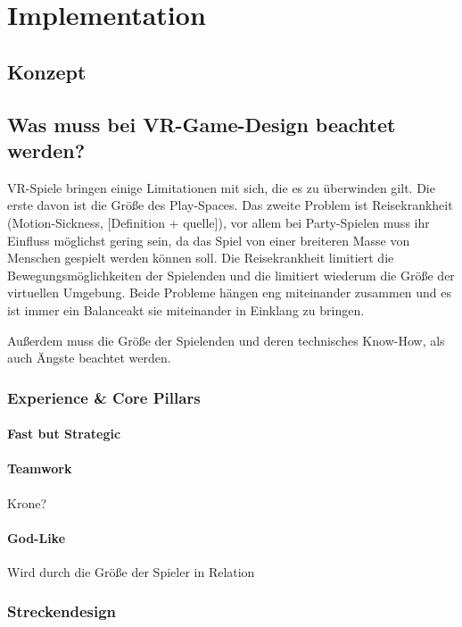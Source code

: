 \chapter{Implementation}

\section{Konzept}

\section{Was muss bei VR-Game-Design beachtet werden?}

VR-Spiele bringen einige Limitationen mit sich, die es zu überwinden gilt. Die erste davon ist die Größe des Play-Spaces. Das zweite Problem ist Reisekrankheit (Motion-Sickness, [Definition + quelle]), vor allem bei Party-Spielen muss ihr Einfluss möglichst gering sein, da das Spiel von einer breiteren Masse von Menschen gespielt werden können soll. Die Reisekrankheit limitiert die Bewegungsmöglichkeiten der Spielenden und die limitiert wiederum die Größe der virtuellen Umgebung. Beide Probleme hängen eng miteinander zusammen und es ist immer ein Balanceakt sie miteinander in Einklang zu bringen. 

Außerdem muss die Größe der Spielenden und deren technisches Know-How, als auch Ängste beachtet werden. 

\subsection{Experience \& Core Pillars}

\subsubsection{Fast but Strategic}

\subsubsection{Teamwork}
Krone?

\subsubsection{God-Like}
Wird durch die Größe der Spieler in Relation 

\subsection{Streckendesign}

